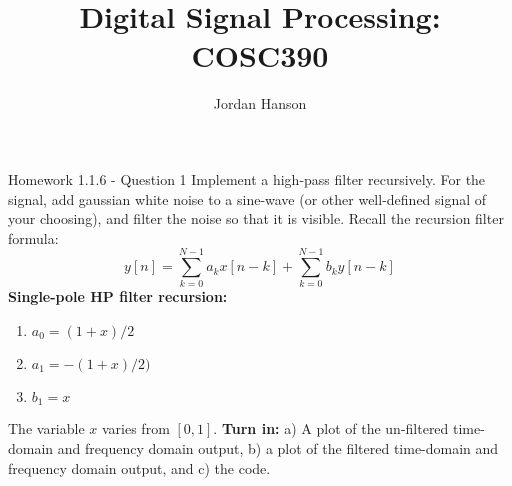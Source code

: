 \documentclass{beamer}
\title{Digital Signal Processing: COSC390}
\author{Jordan Hanson}
\institute{Whittier College Department of Physics and Astronomy}
\begin{document}
\maketitle

\begin{frame}{Homework 1.1.6 - Question 1}
\small
Implement a high-pass filter recursively.  For the signal, add gaussian white noise to a sine-wave (or other well-defined signal of your choosing), and filter the noise so that it is visible.  Recall the recursion filter formula:
\begin{equation}
y[n] = \sum_{k=0}^{N-1} a_k x[n-k] + \sum_{k=0}^{N-1} b_k y[n-k]
\end{equation}
\textbf{Single-pole HP filter recursion:}
\begin{enumerate}
\item $a_0 = (1+x)/2$
\item $a_1 = -(1+x)/2)$
\item $b_1 = x$
\end{enumerate}
The variable $x$ varies from $[0,1]$.  \textbf{Turn in:} a) A plot of the un-filtered time-domain and frequency domain output, b) a plot of the filtered time-domain and frequency domain output, and c) the code.
\end{frame}
\end{document}
